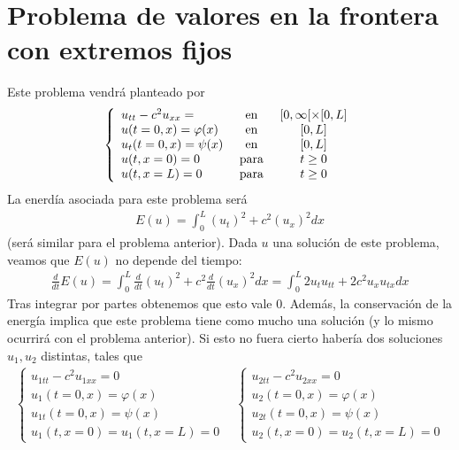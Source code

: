 \section{Problema de valores en la frontera con extremos fijos}
Este problema vendrá planteado por 
\begin{gather*}
    \left\{
    \begin{array}{l c c}
        u_{tt} - c^2u_{xx} = & \text{ en } & [0,\infty[\times [0,L]\\
        u(t=0, x) = \varphi(x) & \text{ en } & [0,L]\\
        u_t(t=0, x) = \psi(x) & \text{ en } & [0,L]\\
        u(t,x=0) = 0 & \text{ para } & t\geq 0\\
        u(t, x=L) = 0 & \text{ para } & t\geq 0
    \end{array}
    \right.
\end{gather*}
La enerdía asociada para este problema será 
\begin{gather*}
    E(u) = \int_{0}^{L} (u_t)^2 + c^2(u_x)^2 dx
\end{gather*}
(será similar para el problema anterior). Dada $u$ una solución de este problema, veamos que $E(u)$ no depende del tiempo:
\begin{gather*}
    \frac{d}{dt} E(u) = \int_{0}^{L} \frac{d}{dt}(u_t)^2 + c^2 \frac{d}{dt}(u_x)^2 dx = \int_{0}^{L}2 u_tu_{tt} + 2c^2u_xu_{tx} dx 
\end{gather*}
Tras integrar por partes obtenemos que esto vale 0. Además, la conservación de la energía implica que este problema tiene como mucho una solución (y lo mismo ocurrirá con el problema anterior). Si esto no fuera cierto habería dos soluciones $u_1,u_2$ distintas, tales que 
\begin{gather*}
    \left\{
    \begin{array}{l}
        u_{1tt} - c^2u_{1xx} = 0\\
        u_1(t=0, x) = \varphi(x)\\
        u_{1t}(t=0, x) = \psi(x)\\
        u_1(t, x=0) = u_1(t, x=L)=0
    \end{array}
    \right. \ \ \ \
    \left\{
    \begin{array}{l}
        u_{2tt} - c^2u_{2xx} = 0\\
        u_2(t=0, x) = \varphi(x)\\
        u_{2t}(t=0, x) = \psi(x)\\
        u_2(t, x=0) = u_2(t, x=L)=0
    \end{array}
    \right.
\end{gather*}
